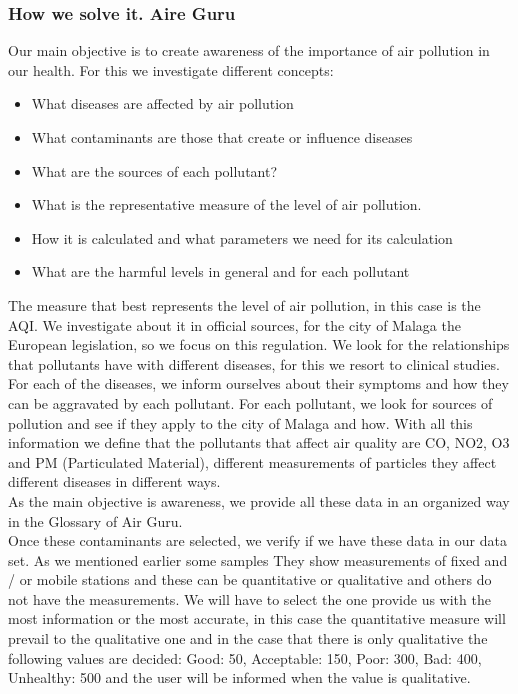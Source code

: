 \subsubsection{How we solve it. Aire Guru} 
Our main objective is to create awareness of the importance of air pollution in our health. For this we investigate different concepts:
\begin{itemize}
    \item What diseases are affected by air pollution
    \item What contaminants are those that create or influence diseases
    \item What are the sources of each pollutant?
    \item What is the representative measure of the level of air pollution.
    \item How it is calculated and what parameters we need for its calculation
    \item What are the harmful levels in general and for each pollutant
\end{itemize}
The measure that best represents the level of air pollution, in this case is the AQI. We investigate about it in official sources, for the city of Malaga the
European legislation, so we focus on this regulation.
We look for the relationships that pollutants have with different diseases, for this we resort to clinical studies. For each of the diseases, we inform ourselves
about their symptoms and how they can be aggravated by each pollutant.
For each pollutant, we look for sources of pollution and see if they apply to the city of Malaga and how.
With all this information we define that the pollutants that affect air quality are CO, NO2, O3 and PM (Particulated Material), different measurements of particles
they affect different diseases in different ways. \\

As the main objective is awareness, we provide all these data in an organized way in the Glossary of Air Guru. \\

Once these contaminants are selected, we verify if we have these data in our data set. As we mentioned earlier some samples
They show measurements of fixed and / or mobile stations and these can be quantitative or qualitative and others do not have the measurements. We will have to select the one
provide us with the most information or the most accurate, in this case the quantitative measure will prevail to the qualitative one and in the case that there is only qualitative
the following values are decided: Good: 50, Acceptable: 150, Poor: 300, Bad: 400, Unhealthy: 500 and the user will be informed when the value is qualitative. \\


